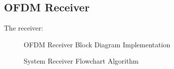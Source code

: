 \subsection{\gls{OFDM} Receiver}
The receiver:
\begin{figure}[htpb!]
	\centerline{\resizebox{15cm}{!}{}}
	\caption{\gls{OFDM} Receiver Block Diagram Implementation}
	\label{fig:ofdm_r_meth}
\end{figure}
\begin{figure}[htpb!]
	\centerline{}
	\caption{System Receiver Flowchart Algorithm}
	\label{fig:ofdm_receiver_meth}
\end{figure}


\pagebreak

